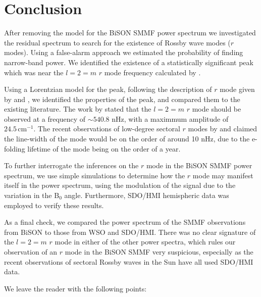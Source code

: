 \section{Conclusion}\label{sec:r-mode_conclusion}

After removing the model for the BiSON SMMF power spectrum we investigated the residual spectrum to search for the existence of Rossby wave modes ($r$ modes). Using a false-alarm approach we estimated the probability of finding narrow-band power. We identified the existence of a statistically significant peak which was near the $l=2=m$ $r$ mode frequency calculated by \citet{lanza_sectoral_2019}.

Using a Lorentzian model for the peak, following the description of $r$ mode given by \citet{loptien_global-scale_2018} and \citet{liang_time-distance_2019}, we identified the properties of the peak, and compared them to the existing literature. The work by \citet{lanza_sectoral_2019} stated that the $l=2=m$ $r$ mode should be observed at a frequency of $\sim 540.8$ nHz, with a maximmum amplitude of $24.5 \, \mathrm{cm}^{-1}$. The recent observations of low-degree sectoral $r$ modes by \citet{loptien_global-scale_2018} and \citet{liang_time-distance_2019} claimed the line-width of the mode would be on the order of around 10 nHz, due to the e-folding lifetime of the mode being on the order of a year.

To further interrogate the inferences on the $r$ mode in the BiSON SMMF power spectrum, we use simple simulations to determine how the $r$ mode may manifest itself in the power spectrum, using the modulation of the signal due to the variation in the B$_0$ angle. Furthermore, SDO/HMI hemispheric data was employed to verify these results.

As a final check, we compared the power spectrum of the SMMF observations from BiSON to those from WSO and SDO/HMI. There was no clear signature of the $l=2=m$ $r$ mode in either of the other power spectra, which rules our observation of an $r$ mode in the BiSON SMMF very suspicious, especially as the recent observations of sectoral Rossby waves in the Sun have all used SDO/HMI data.

We leave the reader with the following points:


